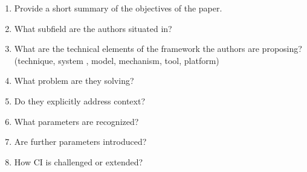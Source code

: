 \documentclass[../thesis.tex]{subfiles}
\begin{document}
\bigskip

\begin{enumerate}
\item Provide a short summary of the
objectives of the paper.
\item What subfield are the authors
situated in?
\item What are the technical elements of
the framework the authors are proposing? (technique, system , model,
mechanism, tool, platform)
\item What problem are they solving?
\item Do they explicitly address context?
\item What parameters are recognized?
\item Are further parameters introduced?
\item How CI is challenged or extended?
\end{enumerate}

\bigskip
\end{document}
